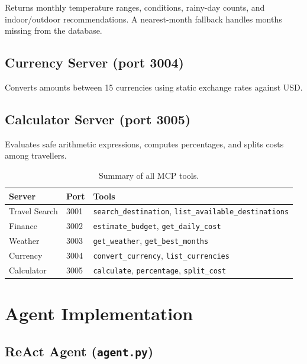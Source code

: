 \documentclass[12pt,a4paper]{article}
\begin{document}
Returns monthly temperature ranges, conditions, rainy-day counts, and
indoor/outdoor recommendations.  A nearest-month fallback handles months
missing from the database.

\subsection{Currency Server (port 3004)}

Converts amounts between 15 currencies using static exchange rates against
USD.

\subsection{Calculator Server (port 3005)}

Evaluates safe arithmetic expressions, computes percentages, and splits
costs among travellers.

\begin{table}[H]
\centering
\caption{Summary of all MCP tools.}
\label{tab:tools}
\begin{tabular}{@{}lll@{}}
\toprule
\textbf{Server} & \textbf{Port} & \textbf{Tools} \\
\midrule
Travel Search & 3001 & \texttt{search\_destination}, \texttt{list\_available\_destinations} \\
Finance       & 3002 & \texttt{estimate\_budget}, \texttt{get\_daily\_cost} \\
Weather       & 3003 & \texttt{get\_weather}, \texttt{get\_best\_months} \\
Currency      & 3004 & \texttt{convert\_currency}, \texttt{list\_currencies} \\
Calculator    & 3005 & \texttt{calculate}, \texttt{percentage}, \texttt{split\_cost} \\
\bottomrule
\end{tabular}
\end{table}

\section{Agent Implementation}

\subsection{ReAct Agent (\texttt{agent.py})}
\end{document}
